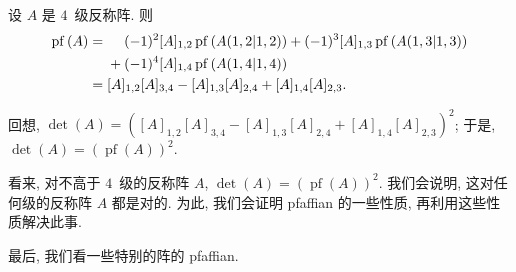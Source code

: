 \documentclass[../libro.tex]{subfiles}
\begin{document}
\begin{example}
    设 \(A\) 是 \(4\)~级反称阵.
    则
    \begin{align*}
        \operatorname{pf} {(A)}
        = {} &
        \hphantom{{} + {}}
        (-1)^2 [A]_{1,2} \operatorname{pf} {(A({1,2}|{1,2}))}
        +
        (-1)^3 [A]_{1,3} \operatorname{pf} {(A({1,3}|{1,3}))}
        \\
        &
        +
        (-1)^4 [A]_{1,4} \operatorname{pf} {(A({1,4}|{1,4}))}
        \\
        = {} &
        [A]_{1,2} [A]_{3,4}
        - [A]_{1,3} [A]_{2,4}
        + [A]_{1,4} [A]_{2,3}.
    \end{align*}

    回想, \(\det {(A)} =
        ([A]_{1,2} [A]_{3,4}
            - [A]_{1,3} [A]_{2,4}
    + [A]_{1,4} [A]_{2,3})^2\);
    于是, \(\det {(A)} = (\operatorname{pf} {(A)})^2\).
\end{example}

看来, 对不高于 \(4\)~级的反称阵 \(A\),
\(\det {(A)} = (\operatorname{pf} {(A)})^2\).
我们会说明, 这对任何级的反称阵 \(A\) 都是对的.
为此, 我们会证明 pfaffian 的一些性质,
再利用这些性质解决此事.

最后, 我们看一些特别的阵的 pfaffian.
\end{document}
